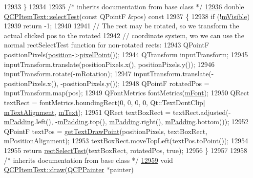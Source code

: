 \begin{DoxyCode}
12933 \}
12934 
12935 \textcolor{comment}{/* inherits documentation from base class */}
\hypertarget{a00115_source_l12936}{}\hyperlink{a00041_a01daa9ff25ec84a738ae05f59af99f4a}{12936} \textcolor{keywordtype}{double} \hyperlink{a00041_a01daa9ff25ec84a738ae05f59af99f4a}{QCPItemText::selectTest}(\textcolor{keyword}{const} QPointF &pos)\textcolor{keyword}{ const}
12937 \textcolor{keyword}{}\{
12938   \textcolor{keywordflow}{if} (!\hyperlink{a00044_a62e3aed8427d6ce3ccf716f285106cb3}{mVisible})
12939     \textcolor{keywordflow}{return} -1;
12940   
12941   \textcolor{comment}{// The rect may be rotated, so we transform the actual clicked pos to the rotated}
12942   \textcolor{comment}{// coordinate system, wo we can use the normal rectSelectTest function for non-rotated rects:}
12943   QPointF positionPixels(\hyperlink{a00041_a0d228a00e819022b5690c65762721129}{position}->\hyperlink{a00038_ae490f9c76ee2ba33752c495d3b6e8fb5}{pixelPoint}());
12944   QTransform inputTransform;
12945   inputTransform.translate(positionPixels.x(), positionPixels.y());
12946   inputTransform.rotate(-\hyperlink{a00041_ac37df0061552225d2277e1ee3b48f2cb}{mRotation});
12947   inputTransform.translate(-positionPixels.x(), -positionPixels.y());
12948   QPointF rotatedPos = inputTransform.map(pos);
12949   QFontMetrics fontMetrics(\hyperlink{a00041_a1dc87fe2a824820d549ffd7e644eef8d}{mFont});
12950   QRect textRect = fontMetrics.boundingRect(0, 0, 0, 0, Qt::TextDontClip|
      \hyperlink{a00041_acdb2e50c38e83da00f083771efbd213f}{mTextAlignment}, \hyperlink{a00041_a2dec3e08c11f51639629374ecec3bd62}{mText});
12951   QRect textBoxRect = textRect.adjusted(-\hyperlink{a00041_ae7b3ef0ce6046efd4b346d28f2e1fb67}{mPadding}.left(), -\hyperlink{a00041_ae7b3ef0ce6046efd4b346d28f2e1fb67}{mPadding}.top(), 
      \hyperlink{a00041_ae7b3ef0ce6046efd4b346d28f2e1fb67}{mPadding}.right(), \hyperlink{a00041_ae7b3ef0ce6046efd4b346d28f2e1fb67}{mPadding}.bottom());
12952   QPointF textPos = \hyperlink{a00041_aa6e478b1ce198eace89157c4cacc3ddc}{getTextDrawPoint}(positionPixels, textBoxRect, 
      \hyperlink{a00041_a6c27f7dc1a962a04b32430cf99f04654}{mPositionAlignment});
12953   textBoxRect.moveTopLeft(textPos.toPoint());
12954 
12955   \textcolor{keywordflow}{return} \hyperlink{a00022_a4c0e14c4e92df91174cb7183fb363069}{rectSelectTest}(textBoxRect, rotatedPos, \textcolor{keyword}{true});
12956 \}
12957 
12958 \textcolor{comment}{/* inherits documentation from base class */}
\hypertarget{a00115_source_l12959}{}\hyperlink{a00041_a8793adb271ab79b4cf391dc55e9987f1}{12959} \textcolor{keywordtype}{void} \hyperlink{a00041_a8793adb271ab79b4cf391dc55e9987f1}{QCPItemText::draw}(\hyperlink{a00047}{QCPPainter} *painter)

\end{DoxyCode}

